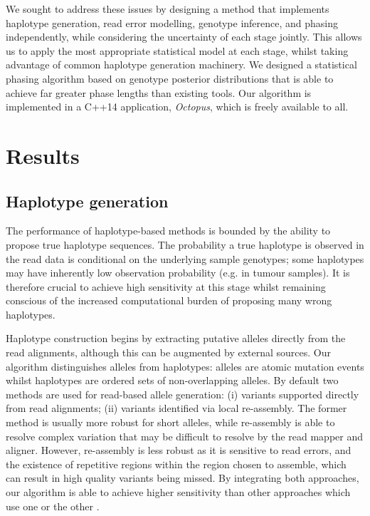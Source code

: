\documentclass[notitlepage, twocolumn]{article}
\begin{document}
We sought to address these issues by designing a method that implements haplotype generation, read error modelling, genotype inference, and phasing independently, while considering the uncertainty of each stage jointly.
This allows us to apply the most appropriate statistical model at each stage, whilst taking advantage of common haplotype generation machinery.
We designed a statistical phasing algorithm based on genotype posterior distributions that is able to achieve far greater phase lengths than existing tools.
Our algorithm is implemented in a C++14 application, \emph{Octopus}, which is freely available to all.

\section*{Results}

\subsection*{Haplotype generation}

The performance of haplotype-based methods is bounded by the ability to propose true haplotype sequences. The probability a true haplotype is observed in the read data is conditional on the underlying sample genotypes; some haplotypes may have inherently low observation probability (e.g. in tumour samples). It is therefore crucial to achieve high sensitivity at this stage whilst remaining conscious of the increased computational burden of proposing many wrong haplotypes.

Haplotype construction begins by extracting putative alleles directly from the read alignments, although this can be augmented by external sources. Our algorithm distinguishes alleles from haplotypes: alleles are atomic mutation events whilst haplotypes are ordered sets of non-overlapping alleles. By default two methods are used for read-based allele generation: (i) variants supported directly from read alignments; (ii) variants identified via local re-assembly. The former method is usually more robust for short alleles, while re-assembly is able to resolve complex variation that may be difficult to resolve by the read mapper and aligner.  However, re-assembly is less robust as it is sensitive to read errors, and the existence of repetitive regions within the region chosen to assemble, which can result in high quality variants being missed. By integrating both approaches, our algorithm is able to achieve higher sensitivity than other approaches which use one or the other \cite{RN141, RN538}.
\end{document}
